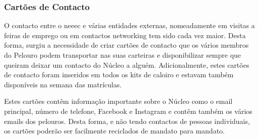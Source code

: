 
\subsubsection{Cartões de Contacto}

O contacto entre o \acrshort{neeec} e várias entidades externas, nomeadamente em visitas a feiras de emprego ou em contactos networking tem sido cada vez maior. Desta forma, surgiu a necessidade de criar cartões de contacto que os vários membros do Pelouro podem transportar nas suas carteiras e disponibilizar sempre que queiram deixar um contacto do Núcleo a alguém. Adicionalmente, estes cartões de contacto foram inseridos em todos os kits de caloiro e estavam também disponíveis na semana das matrículas.

Estes cartões contêm informação importante sobre o Núcleo como o email principal, número de telefone, Facebook e Instagram e contêm também os vários emails dos pelouros. Desta forma, e não tendo contactos de pessoas individuais, os cartões poderão ser facilmente reciclados de mandato para mandato.